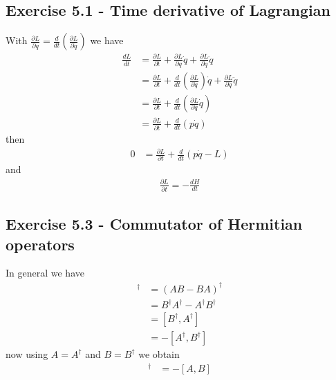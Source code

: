 \documentclass[../main.tex]{subfiles}
\begin{document}
\subsection*{Exercise 5.1 - Time derivative of Lagrangian}
With $\frac{\partial L}{\partial q}=\frac{d}{dt}\left(\frac{\partial L}{\partial \dot{q}}\right)$ we have 
\begin{align}
\frac{dL}{dt}
&=\frac{\partial L}{\partial t}+\frac{\partial L}{\partial q}\dot{q}+\frac{\partial L}{\partial \dot{q}}\ddot{q}\\
&=\frac{\partial L}{\partial t}+\frac{d}{dt}\left(\frac{\partial L}{\partial \dot{q}}\right)\dot{q}+\frac{\partial L}{\partial \dot{q}}\ddot{q}\\
&=\frac{\partial L}{\partial t}+\frac{d}{dt}\left(\frac{\partial L}{\partial \dot{q}}\dot{q}\right)\\
&=\frac{\partial L}{\partial t}+\frac{d}{dt}\left(p\dot{q}\right)
\end{align}
then
\begin{align}
0&=\frac{\partial L}{\partial t}+\frac{d}{dt}\left(p\dot{q}-L\right)
\end{align}
and
\begin{align}
\frac{\partial L}{\partial t}=-\frac{dH}{dt}
\end{align}

\subsection*{Exercise 5.3 - Commutator of Hermitian operators}
In general we have
\begin{align}
[A,B]^\dagger
&=(AB-BA)^\dagger\\
&=B^\dagger A^\dagger-A^\dagger B^\dagger\\
&=[B^\dagger,A^\dagger]\\
&=-[A^\dagger,B^\dagger]
\end{align}
now using $A=A^\dagger$ and $B=B^\dagger$ we obtain
\begin{align}
[A,B]^\dagger
&=-[A,B]
\end{align}
\end{document}

